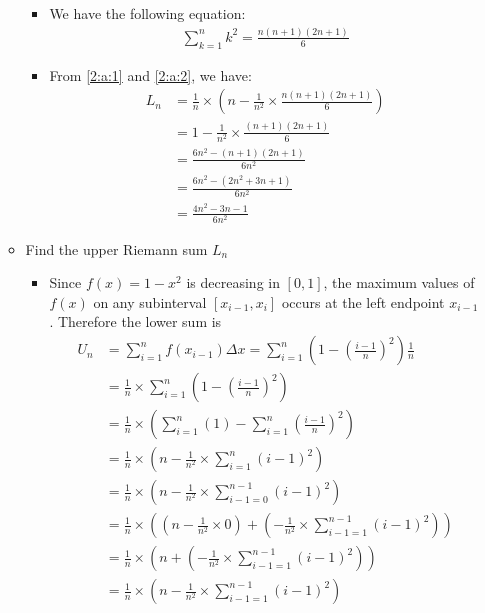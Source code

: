 \documentclass{article}
\begin{document}
\begin{enumerate}[label=({\alph*})]
\begin{itemize}
\begin{itemize}
                \item We have the following equation:
                \begin{align}
                    \sum_{k=1}^n k^2 = \frac{n(n+ 1)(2n + 1)}{6} \label{2:a:2}
                \end{align}
                \item From \eqref{2:a:1} and \eqref{2:a:2}, we have:
                \begin{align*}
                    L_{n} &= \frac{1}{n} \times \left( n - \frac{1}{n^2} \times \frac{n(n + 1)(2n + 1)}{6}\right) \\
                          &= 1 - \frac{1}{n^{2}} \times \frac{(n + 1)(2n + 1)}{6} \\
                          &= \frac{6n^2 - (n + 1)(2n + 1)}{6n^2} \\
                          &= \frac{6n^2 - (2n^2 + 3n + 1)}{6n^2} \\
                          &= \frac{4n^2 - 3n - 1}{6n^2}
                \end{align*}
            \end{itemize}
            \item Find the upper Riemann sum \(L_{n}\)
            \begin{itemize}
                \item Since \(f(x) = 1 - x^{2}\) is decreasing in \([0, 1]\), the maximum values of \(f(x)\) on any subinterval \([x_{i - 1}, x_{i}]\) occurs at the left endpoint \(x_{i - 1}\). Therefore the lower sum is
                \begin{align}
                    U_{n} &= \sum_{i=1}^n f(x_{i - 1}) \Delta x = \sum_{i=1}^n \left(1 - \left(\frac{i - 1}{n}\right)^2\right) \frac{1}{n}\\
                          &= \frac{1}{n} \times \sum_{i=1}^n \left(1 - \left(\frac{i - 1}{n}\right)^2\right) \\
                          &= \frac{1}{n} \times  \left(\sum_{i=1}^n(1) - \sum_{i = 1}^n(\frac{i - 1}{n})^2\right)\\
                          &= \frac{1}{n} \times  \left(n - \frac{1}{n^2} \times \sum_{i = 1}^n (i - 1)^{2}\right) \\
                          &= \frac{1}{n} \times  \left(n - \frac{1}{n^2} \times \sum_{i - 1 = 0}^{n - 1} (i - 1)^{2}\right) \\
                          &= \frac{1}{n} \times  \left(\left(n - \frac{1}{n^2} \times 0\right) + \left( - \frac{1}{n^2} \times \sum_{i - 1= 1}^{n - 1} (i - 1)^{2}\right)\right) \\
                          &= \frac{1}{n} \times  \left(n + \left( - \frac{1}{n^2} \times \sum_{i - 1= 1}^{n - 1} (i - 1)^{2}\right)\right) \\
                          &= \frac{1}{n} \times  \left(n - \frac{1}{n^2} \times \sum_{i - 1= 1}^{n - 1} (i - 1)^{2}\right) \label{2:a:3}\\
                \end{align}


\end{itemize}
\end{itemize}
\end{enumerate}
\end{document}
